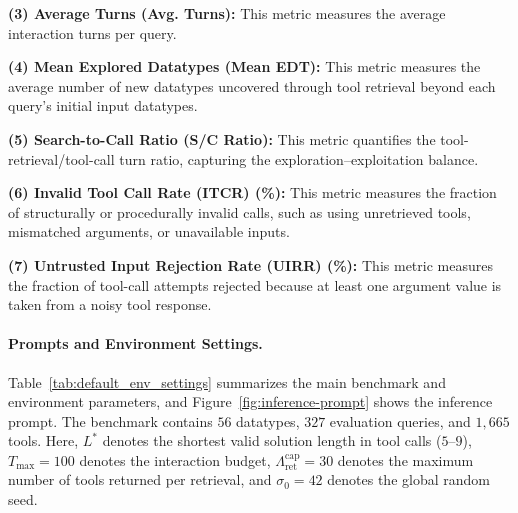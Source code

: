 \documentclass{llmxive}
\begin{document}
\noindent \textbf{(3) Average Turns (Avg. Turns):} This metric measures the average interaction turns per query.

\noindent \textbf{(4) Mean Explored Datatypes (Mean EDT):} This metric measures the average number of new datatypes uncovered through tool retrieval beyond each query’s initial input datatypes.

\noindent \textbf{(5) Search-to-Call Ratio (S/C Ratio):} This metric quantifies the tool-retrieval/tool-call turn ratio, capturing the exploration–exploitation balance.


\noindent \textbf{(6) Invalid Tool Call Rate (ITCR) (\%):} This metric measures the fraction of structurally or procedurally invalid calls, such as using unretrieved tools, mismatched arguments, or unavailable inputs.

\noindent \textbf{(7) Untrusted Input Rejection Rate (UIRR) (\%):} This metric measures the fraction of tool-call attempts rejected because at least one argument value is taken from a noisy tool response.




\paragraph{Prompts and Environment Settings.}
Table~\ref{tab:default_env_settings} summarizes the main benchmark and environment parameters, and Figure~\ref{fig:inference-prompt} shows the inference prompt.
The benchmark contains $56$ datatypes, $327$ evaluation queries, and $1{,}665$ tools.
Here, $L^*$ denotes the shortest valid solution length in tool calls ($5$--$9$), $T_{\max}=100$ denotes the interaction budget, $\Lambda_{\mathrm{ret}}^{\mathrm{cap}}=30$ denotes the maximum number of tools returned per retrieval, and $\sigma_0=42$ denotes the global random seed.




\end{document}
